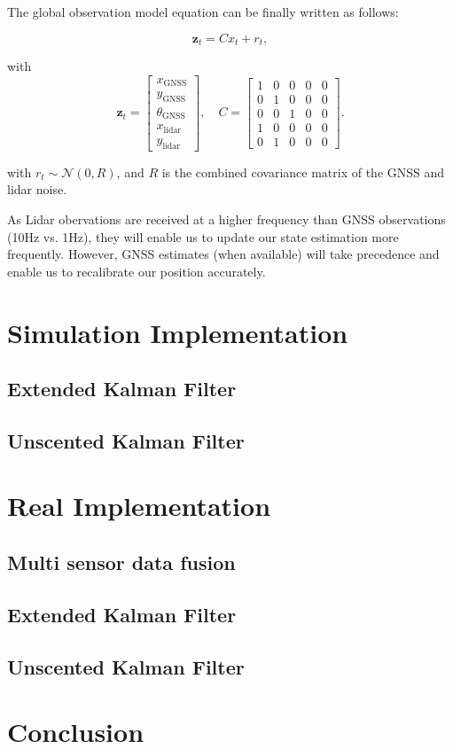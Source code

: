 \documentclass[conference]{IEEEtran}
\begin{document}
\noindent The global observation model equation can be finally written as follows:

\[
\mathbf{z}_t = C x_t + r_t,
\]

with
\[
\mathbf{z}_t =
\begin{bmatrix}
x_\text{GNSS} \\
y_\text{GNSS} \\
\theta_\text{GNSS} \\
x_\text{lidar} \\
y_\text{lidar}
\end{bmatrix}, \quad
C =
\begin{bmatrix}
1 & 0 & 0 & 0 & 0 \\
0 & 1 & 0 & 0 & 0 \\
0 & 0 & 1 & 0 & 0 \\
1 & 0 & 0 & 0 & 0 \\
0 & 1 & 0 & 0 & 0
\end{bmatrix}.
\]

\noindent with \( r_t \sim \mathcal{N}(0, R) \), and \( R \) is the combined covariance matrix of the GNSS and lidar noise.

\vspace{3mm}

\noindent As Lidar obervations are received at a higher frequency than GNSS observations (10Hz vs. 1Hz), they will enable us to update our state estimation more frequently. However, GNSS estimates (when available) will take precedence and enable us to recalibrate our position accurately.

\section{Simulation Implementation}

\subsection{Extended Kalman Filter}

\subsection{Unscented Kalman Filter}

\section{Real Implementation}

\subsection{Multi sensor data fusion}

\subsection{Extended Kalman Filter}

\subsection{Unscented Kalman Filter}

\section{Conclusion}
\end{document}
